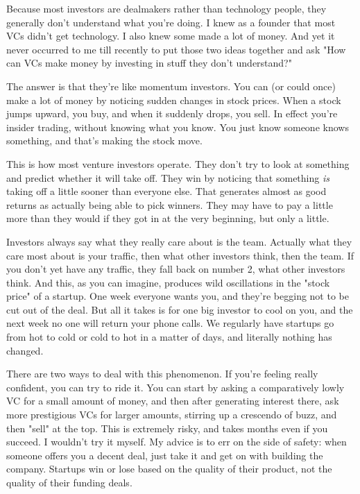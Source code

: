Because most investors are dealmakers rather than
                  technology people, they generally don't understand what you're
                  doing. I knew as a founder that most VCs didn't get
                  technology. I also knew some made a lot of money. And yet it
                  never occurred to me till recently to put those two ideas
                  together and ask "How can VCs make money by investing in stuff
                  they don't understand?"

The answer is that they're
                  like momentum investors. You can (or could once) make a lot of
                  money by noticing sudden changes in stock prices. When a stock
                  jumps upward, you buy, and when it suddenly drops, you sell.
                  In effect you're insider trading, without knowing what you
                  know. You just know someone knows something, and that's making
                  the stock move.

This is how most venture investors
                  operate. They don't try to look at something and predict
                  whether it will take off. They win by noticing that something
                  \emph{is} taking off a little sooner than everyone else. That
                  generates almost as good returns as actually being able to
                  pick winners. They may have to pay a little more than they
                  would if they got in at the very beginning, but only a
                  little.

Investors always say what they really care
                  about is the team. Actually what they care most about is your
                  traffic, then what other investors think, then the team. If
                  you don't yet have any traffic, they fall back on number 2,
                  what other investors think. And this, as you can imagine,
                  produces wild oscillations in the "stock price" of a startup.
                  One week everyone wants you, and they're begging not to be cut
                  out of the deal. But all it takes is for one big investor to
                  cool on you, and the next week no one will return your phone
                  calls. We regularly have startups go from hot to cold or cold
                  to hot in a matter of days, and literally nothing has
                  changed.

There are two ways to deal with this
                  phenomenon. If you're feeling really confident, you can try to
                  ride it. You can start by asking a comparatively lowly VC for
                  a small amount of money, and then after generating interest
                  there, ask more prestigious VCs for larger amounts, stirring
                  up a crescendo of buzz, and then "sell" at the top. This is
                  extremely risky, and takes months even if you succeed. I
                  wouldn't try it myself. My advice is to err on the side of
                  safety: when someone offers you a decent deal, just take it
                  and get on with building the company. Startups win or lose
                  based on the quality of their product, not the quality of
                  their funding deals.

